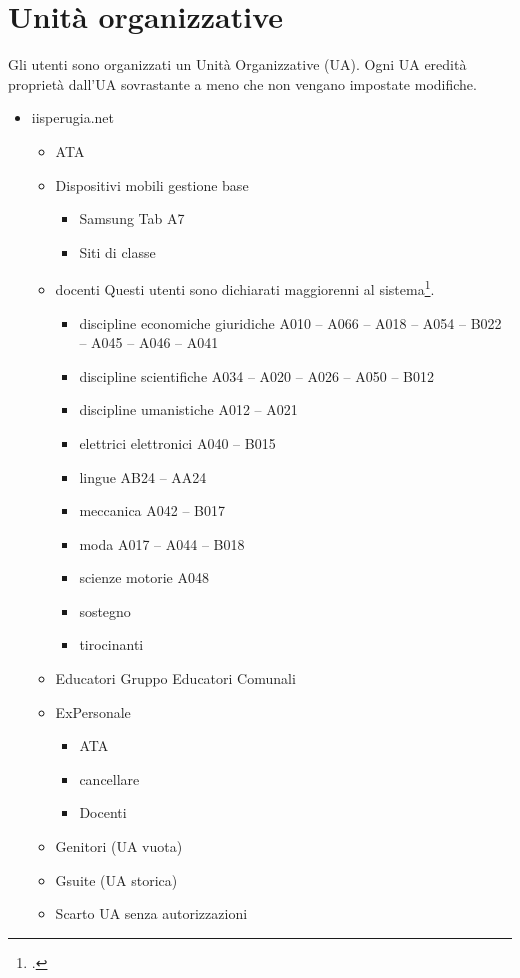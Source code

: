 \chapter{Unità organizzative}
Gli utenti sono organizzati un Unità Organizzative (UA). Ogni UA eredità proprietà dall'UA sovrastante a meno che non vengano impostate modifiche.
\begin{itemize}
	\item iisperugia.net
	\begin{itemize}
		\item ATA
		\item Dispositivi mobili gestione base
		\begin{itemize}
			\item Samsung Tab A7
			\item Siti di classe
		\end{itemize}
	\item docenti Questi utenti sono dichiarati maggiorenni al sistema\footcite{Google2021b}.
	\begin{itemize}
		\item discipline economiche giuridiche A010 – A066 – A018 – A054 – B022 – A045 – A046 – A041
		\item discipline scientifiche
		A034 – A020 – A026 – A050 – B012
		\item discipline umanistiche
		A012 – A021
		\item elettrici elettronici
		A040 – B015
		\item lingue
		AB24 – AA24
		\item meccanica
		A042 – B017
		\item moda
		A017 – A044 – B018
		\item scienze motorie
		A048 
		\item sostegno
		\item tirocinanti
		\end{itemize}
\item  Educatori
Gruppo Educatori Comunali
\item ExPersonale
\begin{itemize}
	\item ATA
	\item cancellare
	\item Docenti
\end{itemize}
\item Genitori (UA vuota)
\item Gsuite (UA storica)
\item Scarto UA senza autorizzazioni

\end{itemize}
\end{itemize}
